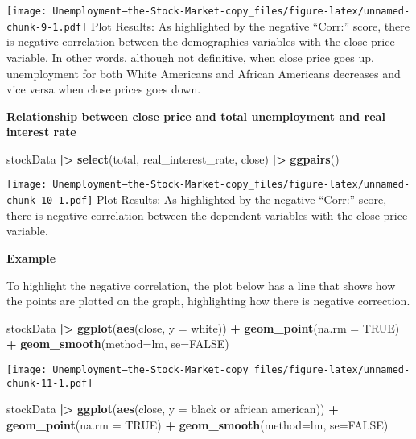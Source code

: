 \documentclass[
]{article}
\newenvironment{Shaded}{\begin{snugshade}}{\end{snugshade}}
\newcommand{\AttributeTok}[1]{\textcolor[rgb]{0.13,0.29,0.53}{#1}}
\newcommand{\ConstantTok}[1]{\textcolor[rgb]{0.56,0.35,0.01}{#1}}
\newcommand{\FunctionTok}[1]{\textcolor[rgb]{0.13,0.29,0.53}{\textbf{#1}}}
\newcommand{\NormalTok}[1]{#1}
\newcommand{\SpecialCharTok}[1]{\textcolor[rgb]{0.81,0.36,0.00}{\textbf{#1}}}
\newcommand{\StringTok}[1]{\textcolor[rgb]{0.31,0.60,0.02}{#1}}
\begin{document}
\texttt{[image: Unemployment---the-Stock-Market-copy\_files/figure-latex/unnamed-chunk-9-1.pdf]}
Plot Results: As highlighted by the negative ``Corr:'' score, there is
negative correlation between the demographics variables with the close
price variable. In other words, although not definitive, when close
price goes up, unemployment for both White Americans and African
Americans decreases and vice versa when close prices goes down.

\textbf{Relationship between close price and total unemployment and real
interest rate}

\begin{Shaded}
\begin{Highlighting}[]
\NormalTok{stockData }\SpecialCharTok{|\textgreater{}}
  \FunctionTok{select}\NormalTok{(total, real\_interest\_rate, close) }\SpecialCharTok{|\textgreater{}}
  \FunctionTok{ggpairs}\NormalTok{()}
\end{Highlighting}
\end{Shaded}

\texttt{[image: Unemployment---the-Stock-Market-copy\_files/figure-latex/unnamed-chunk-10-1.pdf]}
Plot Results: As highlighted by the negative ``Corr:'' score, there is
negative correlation between the dependent variables with the close
price variable.

\textbf{Example}

To highlight the negative correlation, the plot below has a line that
shows how the points are plotted on the graph, highlighting how there is
negative correction.

\begin{Shaded}
\begin{Highlighting}[]
\NormalTok{stockData }\SpecialCharTok{|\textgreater{}}
  \FunctionTok{ggplot}\NormalTok{(}\FunctionTok{aes}\NormalTok{(close, }\AttributeTok{y =}\NormalTok{ white)) }\SpecialCharTok{+}
  \FunctionTok{geom\_point}\NormalTok{(}\AttributeTok{na.rm =} \ConstantTok{TRUE}\NormalTok{) }\SpecialCharTok{+}
  \FunctionTok{geom\_smooth}\NormalTok{(}\AttributeTok{method=}\NormalTok{lm, }\AttributeTok{se=}\ConstantTok{FALSE}\NormalTok{)}
\end{Highlighting}
\end{Shaded}

\texttt{[image: Unemployment---the-Stock-Market-copy\_files/figure-latex/unnamed-chunk-11-1.pdf]}

\begin{Shaded}
\begin{Highlighting}[]
\NormalTok{stockData }\SpecialCharTok{|\textgreater{}}
  \FunctionTok{ggplot}\NormalTok{(}\FunctionTok{aes}\NormalTok{(close, }\AttributeTok{y =} \StringTok{\textasciigrave{}}\AttributeTok{black or african american}\StringTok{\textasciigrave{}}\NormalTok{)) }\SpecialCharTok{+}
  \FunctionTok{geom\_point}\NormalTok{(}\AttributeTok{na.rm =} \ConstantTok{TRUE}\NormalTok{) }\SpecialCharTok{+}
  \FunctionTok{geom\_smooth}\NormalTok{(}\AttributeTok{method=}\NormalTok{lm, }\AttributeTok{se=}\ConstantTok{FALSE}\NormalTok{)}
\end{Highlighting}
\end{Shaded}
\end{document}
